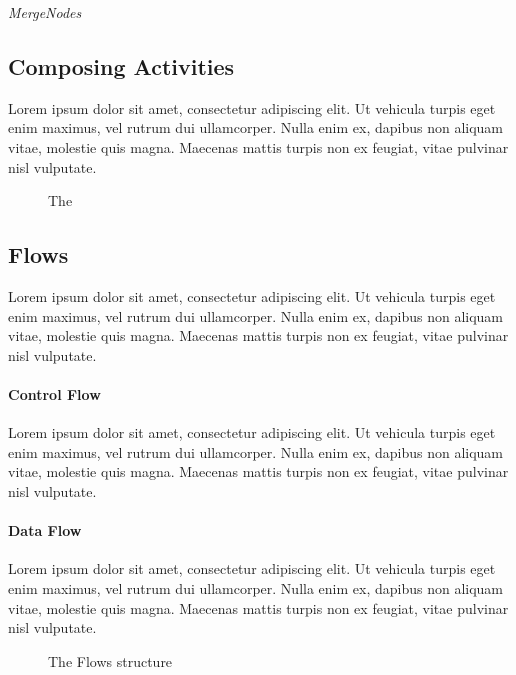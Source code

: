 \emph{MergeNodes} 

\subsection{Composing Activities}

Lorem ipsum dolor sit amet, consectetur adipiscing elit. Ut vehicula turpis eget enim maximus, vel rutrum dui ullamcorper. Nulla enim ex, dapibus non aliquam vitae, molestie quis magna. Maecenas mattis turpis non ex feugiat, vitae pulvinar nisl vulputate.

\begin{figure}[!ht]
\centering

\caption{The }
\label{fig:composite_activity}
\end{figure}

\subsection{Flows}\label{ssec:flows}

Lorem ipsum dolor sit amet, consectetur adipiscing elit. Ut vehicula turpis eget enim maximus, vel rutrum dui ullamcorper. Nulla enim ex, dapibus non aliquam vitae, molestie quis magna. Maecenas mattis turpis non ex feugiat, vitae pulvinar nisl vulputate.

\paragraph{Control Flow}

Lorem ipsum dolor sit amet, consectetur adipiscing elit. Ut vehicula turpis eget enim maximus, vel rutrum dui ullamcorper. Nulla enim ex, dapibus non aliquam vitae, molestie quis magna. Maecenas mattis turpis non ex feugiat, vitae pulvinar nisl vulputate.

\paragraph{Data Flow}\label{par:data_flow}

Lorem ipsum dolor sit amet, consectetur adipiscing elit. Ut vehicula turpis eget enim maximus, vel rutrum dui ullamcorper. Nulla enim ex, dapibus non aliquam vitae, molestie quis magna. Maecenas mattis turpis non ex feugiat, vitae pulvinar nisl vulputate.

\begin{figure}[!ht]
	\centering
	
	\caption{The Flows structure}
	\label{fig:flows}
\end{figure}

